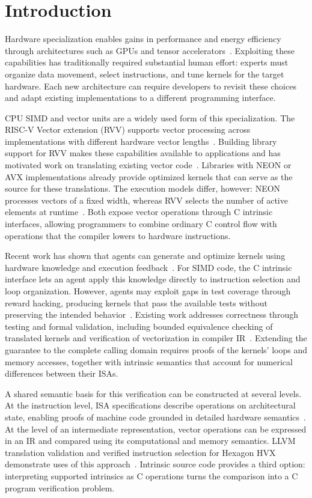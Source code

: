 \section{Introduction}
\label{sec:intro}

Hardware specialization enables gains in performance and energy efficiency through architectures such as GPUs and tensor accelerators~\cite{autocomp}. Exploiting these capabilities has traditionally required substantial human effort: experts must organize data movement, select instructions, and tune kernels for the target hardware. Each new architecture can require developers to revisit these choices and adapt existing implementations to a different programming interface.

CPU SIMD and vector units are a widely used form of this specialization. The RISC-V Vector extension (RVV) supports vector processing across implementations with different hardware vector lengths~\cite{rvv}. Building library support for RVV makes these capabilities available to applications and has motivated work on translating existing vector code~\cite{intrintrans,saltyrn}. Libraries with NEON or AVX implementations already provide optimized kernels that can serve as the source for these translations. The execution models differ, however: NEON processes vectors of a fixed width, whereas RVV selects the number of active elements at runtime~\cite{acle,rvv}. Both expose vector operations through C intrinsic interfaces, allowing programmers to combine ordinary C control flow with operations that the compiler lowers to hardware instructions.

Recent work has shown that agents can generate and optimize kernels using hardware knowledge and execution feedback~\cite{kernelbench,autocomp,saltyrn}. For SIMD code, the C intrinsic interface lets an agent apply this knowledge directly to instruction selection and loop organization. However, agents may exploit gaps in test coverage through reward hacking, producing kernels that pass the available tests without preserving the intended behavior~\cite{kernelbench-eval}. Existing work addresses correctness through testing and formal validation, including bounded equivalence checking of translated kernels and verification of vectorization in compiler IR~\cite{saltyrn,llm-vectorizer}. Extending the guarantee to the complete calling domain requires proofs of the kernels' loops and memory accesses, together with intrinsic semantics that account for numerical differences between their ISAs.

A shared semantic basis for this verification can be constructed at several levels. At the instruction level, ISA specifications describe operations on architectural state, enabling proofs of machine code grounded in detailed hardware semantics~\cite{sail,islaris}. At the level of an intermediate representation, vector operations can be expressed in an IR and compared using its computational and memory semantics. LLVM translation validation and verified instruction selection for Hexagon HVX demonstrate uses of this approach~\cite{alive2,rake}. Intrinsic source code provides a third option: interpreting supported intrinsics as C operations turns the comparison into a C program verification problem.

